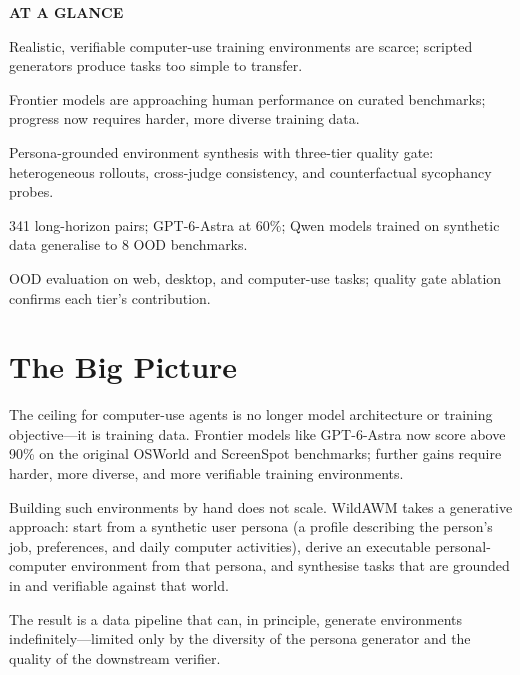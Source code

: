 \documentclass[10pt,twocolumn]{article}
\begin{document}
\begin{mdframed}[backgroundcolor=boxgray,linecolor=rulered,linewidth=1pt,
    innerleftmargin=6pt,innerrightmargin=6pt,
    innertopmargin=6pt,innerbottommargin=6pt]
\textbf{\small AT A GLANCE}\par\vspace{4pt}
\begin{description}[leftmargin=0pt,labelsep=4pt,itemsep=2pt,parsep=0pt,
    font=\small\bfseries]
  \item[Problem:] Realistic, verifiable computer-use training environments
    are scarce; scripted generators produce tasks too simple to transfer.
  \item[Why it matters:] Frontier models are approaching human performance
    on curated benchmarks; progress now requires harder, more diverse
    training data.
  \item[Method:] Persona-grounded environment synthesis with three-tier
    quality gate: heterogeneous rollouts, cross-judge consistency, and
    counterfactual sycophancy probes.
  \item[Result:] 341 long-horizon pairs; GPT-6-Astra at 60\%; Qwen models
    trained on synthetic data generalise to 8 OOD benchmarks.
  \item[Evidence:] OOD evaluation on web, desktop, and computer-use tasks;
    quality gate ablation confirms each tier's contribution.
\end{description}
\end{mdframed}

\section{The Big Picture}

The ceiling for computer-use agents is no longer model architecture or
training objective---it is training data. Frontier models like GPT-6-Astra
now score above 90\% on the original OSWorld and ScreenSpot benchmarks;
further gains require harder, more diverse, and more verifiable training
environments.

Building such environments by hand does not scale. WildAWM takes a generative
approach: start from a synthetic user persona (a profile describing the
person's job, preferences, and daily computer activities), derive an
executable personal-computer environment from that persona, and synthesise
tasks that are grounded in and verifiable against that world.

The result is a data pipeline that can, in principle, generate environments
indefinitely---limited only by the diversity of the persona generator and
the quality of the downstream verifier.
\end{document}
